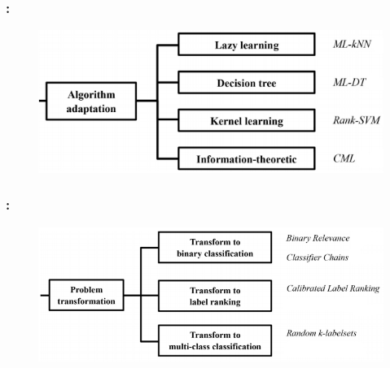 \documentclass{beamer}
\begin{document}

\begin{frame}
\frametitle{\insertsection : \insertsubsection}
\begin{figure}
	\begin{center}
		\includegraphics[scale = 0.75]{images/aa.png}
	\end{center}
\end{figure}
\end{frame}

\begin{frame}
\frametitle{\insertsection : \insertsubsection}
\begin{figure}
	\begin{center}
		\includegraphics[scale = 0.7]{images/pt.png}
	\end{center}
\end{figure}
\end{frame}

\end{document}
